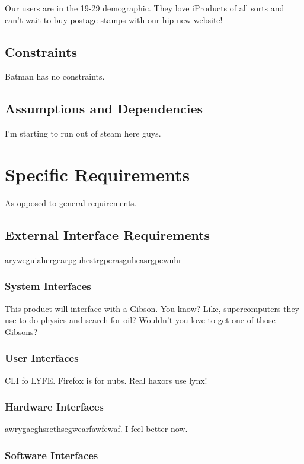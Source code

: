 \documentclass{scrreprt}
\begin{document}
Our users are in the 19-29 demographic. They love iProducts of all sorts and 
can't wait to buy postage stamps with our hip new website!

\section{Constraints}

Batman has no constraints.

\section{Assumptions and Dependencies}

I'm starting to run out of steam here guys.

\chapter{Specific Requirements}

As opposed to general requirements.

\section{External Interface Requirements}

aryweguiahergearpguhestrgperasguheasrgpewuhr

\subsection{System Interfaces}

This product will interface with a Gibson. You know? Like, supercomputers 
they use to do physics and search for oil? Wouldn't you love to get one of 
those Gibsons?

\subsection{User Interfaces}

CLI fo LYFE. Firefox is for nubs. Real haxors use lynx!

\subsection{Hardware Interfaces}

awrygaeghsrethsegwearfawfewaf. I feel better now.

\subsection{Software Interfaces}
\end{document}
